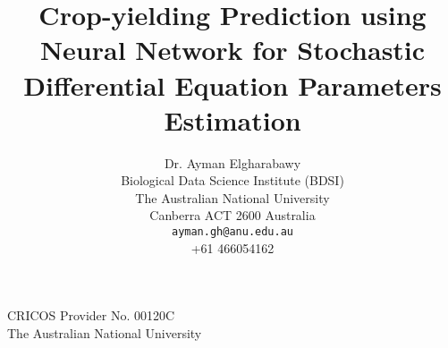 \documentclass[12pt]{article}
\title{Crop-yielding Prediction using Neural Network for Stochastic Differential Equation Parameters Estimation}
\author{Dr. Ayman Elgharabawy \\
Biological Data Science Institute (BDSI) \\
The Australian National University \\
Canberra ACT 2600 Australia \\
\texttt{ayman.gh@anu.edu.au} \\
+61 466054162}
\date{}
\begin{document}
\maketitle













\vfill
\noindent CRICOS Provider No. 00120C \\
The Australian National University
\end{document}
